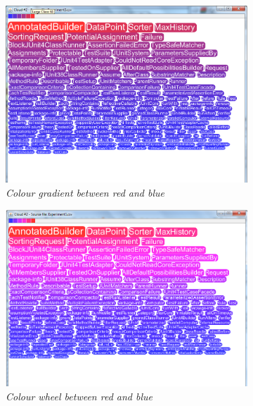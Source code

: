 \begin{figure}[!htb]
\begin{subfigure}{.5\textwidth}
	\centering
	\includegraphics[scale=0.20]{colourbuckets3.png}
	\caption{\textit{Colour gradient between red and blue}}
\end{subfigure}%
\begin{subfigure}{.5\textwidth}
  \centering
  \includegraphics[scale=0.20]{colourbuckets4.png}
  \caption{\textit{Colour wheel between red and blue}}
\end{subfigure}
\begin{subfigure}{\textwidth}
  \centering

\end{subfigure}
\end{figure}
